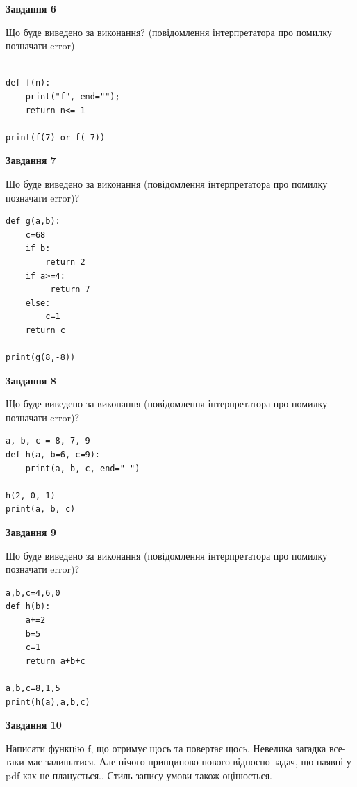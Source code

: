 \documentclass[12pt, ukrainian]{article}
\begin{document}
{\begin {large}
{\begin {center}\textbf{Завдання 6}\end {center}}

Що буде виведено за виконання? (повідомлення інтерпретатора про помилку позначати error)\par
\begin{verbatim}

def f(n):
    print("f", end="");
    return n<=-1

print(f(7) or f(-7))
\end{verbatim}

{\begin {center}\textbf{Завдання 7}\end {center}}

Що буде виведено за виконання (повідомлення інтерпретатора про помилку позначати error)?\par
\begin{verbatim}
def g(a,b):
    c=68
    if b:
        return 2
    if a>=4:
         return 7
    else: 
        c=1
    return c

print(g(8,-8))
\end{verbatim}

{\begin {center}\textbf{Завдання 8}\end {center}}

Що буде виведено за виконання (повідомлення інтерпретатора про помилку позначати error)?\par
\begin{verbatim}
a, b, c = 8, 7, 9
def h(a, b=6, c=9):
    print(a, b, c, end=" ")

h(2, 0, 1)
print(a, b, c)
\end{verbatim}

{\begin {center}\textbf{Завдання 9}\end {center}}

Що буде виведено за виконання (повідомлення інтерпретатора про помилку позначати error)?\par
\begin{verbatim}
a,b,c=4,6,0
def h(b):
    a+=2
    b=5
    c=1
    return a+b+c

a,b,c=8,1,5
print(h(a),a,b,c)
\end{verbatim}

{\begin {center}\textbf{Завдання 10}\end {center}}


Написати функцiю f, що отримує щось та повертає щось. Невелика загадка все-таки має залишатися. Але нічого принципово нового відносно задач, що наявні у pdf-ках не планується.. Стиль запису умови також оцінюється.\par
\end {large}}
\newpage
\end{document}
